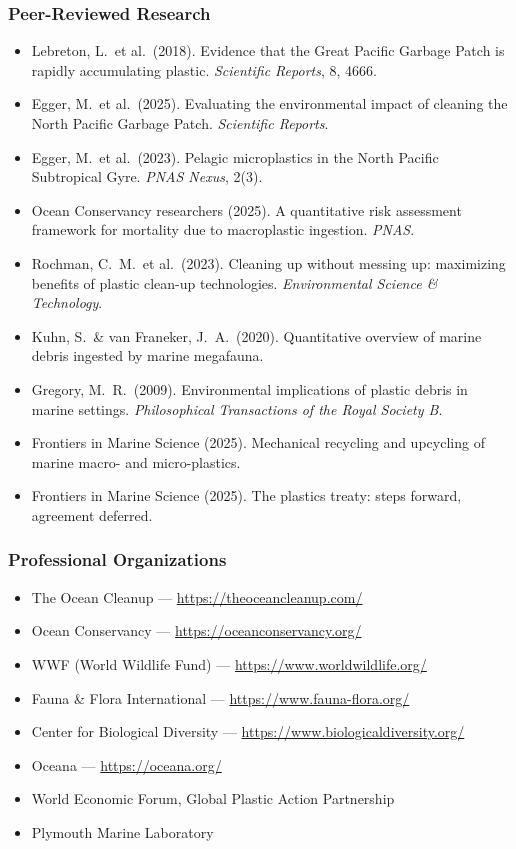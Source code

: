 \documentclass[11pt,letterpaper]{article}
\begin{document}
\subsubsection{Peer-Reviewed Research}
\begin{itemize}[leftmargin=2em]
\item Lebreton, L.\ et al.\ (2018). Evidence that the Great Pacific Garbage Patch is rapidly accumulating plastic. \emph{Scientific Reports}, 8, 4666.
\item Egger, M.\ et al.\ (2025). Evaluating the environmental impact of cleaning the North Pacific Garbage Patch. \emph{Scientific Reports}.
\item Egger, M.\ et al.\ (2023). Pelagic microplastics in the North Pacific Subtropical Gyre. \emph{PNAS Nexus}, 2(3).
\item Ocean Conservancy researchers (2025). A quantitative risk assessment framework for mortality due to macroplastic ingestion. \emph{PNAS}.
\item Rochman, C.\ M.\ et al.\ (2023). Cleaning up without messing up: maximizing benefits of plastic clean-up technologies. \emph{Environmental Science \& Technology}.
\item Kuhn, S.\ \& van Franeker, J.\ A.\ (2020). Quantitative overview of marine debris ingested by marine megafauna.
\item Gregory, M.\ R.\ (2009). Environmental implications of plastic debris in marine settings. \emph{Philosophical Transactions of the Royal Society B}.
\item Frontiers in Marine Science (2025). Mechanical recycling and upcycling of marine macro- and micro-plastics.
\item Frontiers in Marine Science (2025). The plastics treaty: steps forward, agreement deferred.
\end{itemize}

\subsubsection{Professional Organizations}
\begin{itemize}[leftmargin=2em]
\item The Ocean Cleanup --- \url{https://theoceancleanup.com/}
\item Ocean Conservancy --- \url{https://oceanconservancy.org/}
\item WWF (World Wildlife Fund) --- \url{https://www.worldwildlife.org/}
\item Fauna \& Flora International --- \url{https://www.fauna-flora.org/}
\item Center for Biological Diversity --- \url{https://www.biologicaldiversity.org/}
\item Oceana --- \url{https://oceana.org/}
\item World Economic Forum, Global Plastic Action Partnership
\item Plymouth Marine Laboratory
\end{itemize}
\end{document}
